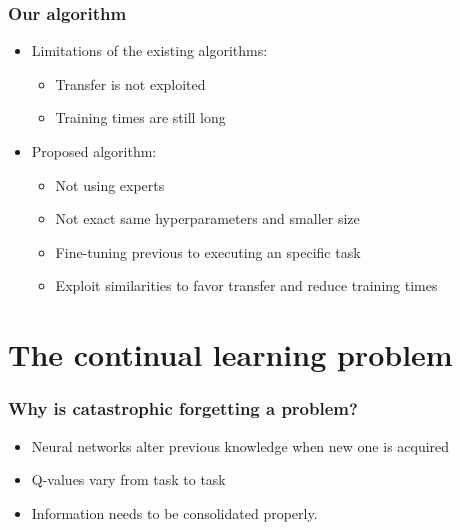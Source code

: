 \documentclass{beamer}
\theoremstyle{remark}
\theoremstyle{plain}
\begin{document}
\begin{frame}
\frametitle{Our algorithm}
\begin{itemize}
    \item Limitations of the existing algorithms:
    \begin{itemize}
        \item Transfer is not exploited
        \item Training times are still long
    \end{itemize}
\item Proposed algorithm:
        \begin{itemize}
            \item Not using experts
            \item Not exact same hyperparameters and smaller size
            \item Fine-tuning previous to executing an specific task
            \item Exploit similarities to favor transfer and reduce training times
        \end{itemize}
\end{itemize}
    
\end{frame}
\section{The continual learning problem}
\label{sec:continual}

\begin{frame}
 \frametitle{Why is catastrophic forgetting a problem?}
  \begin{itemize}
      \item Neural networks alter previous knowledge when new one is acquired
      \item Q-values vary from task to task
      \item Information needs to be consolidated properly.
  \end{itemize}
\end{frame}
\end{document}
